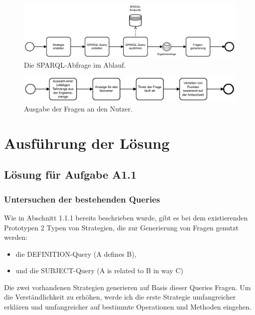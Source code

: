 \documentclass[headsepline,titlepage,ngerman,twoside,12pt]{report}
\newcommand\todo[1]{}%
\begin{document}
\begin{figure}
\centering
\includegraphics[width=\textwidth]{images/sparql-gen.pdf}
\caption{Die SPARQL-Abfrage im Ablauf.}
\label{img:sparql-question-generation}
\end{figure}

\begin{figure}
\centering
\includegraphics[width=\textwidth]{images/ausg-frage.pdf}
\caption{Ausgabe der Fragen an den Nutzer.}
\label{img:question-output-to-user}
\end{figure}

\chapter{Ausführung der Lösung}
\section{Lösung für Aufgabe A1.1}
\subsection{Untersuchen der bestehenden Queries}
\todo{Tatsächlichen Referrer zu 1.1.1 hinzufügen}
Wie in Abschnitt 1.1.1 bereits beschrieben wurde, gibt es bei dem existierenden Prototypen 2 Typen von Strategien, die zur Generierung von Fragen genutzt werden:
\begin{itemize}
\item die DEFINITION-Query (A defines B),
\item und die SUBJECT-Query (A is related to B in way C)
\end{itemize}
Die zwei vorhandenen Strategien generieren auf Basis dieser Queries Fragen.
Um die Verständlichkeit zu erhöhen, werde ich die erste Strategie umfangreicher erklären und umfangreicher auf bestimmte Operationen und Methoden eingehen.
\end{document}
